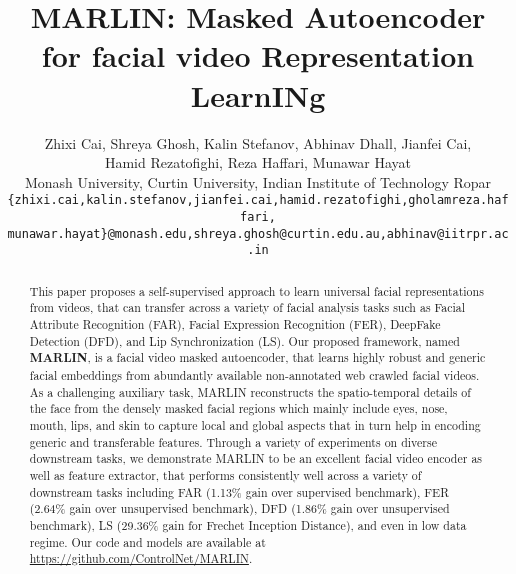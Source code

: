 \documentclass[10pt,twocolumn,letterpaper]{article}
\begin{document}
\title{MARLIN: \textbf{M}asked \textbf{A}utoencoder for facial video \textbf{R}epresentation \textbf{L}earn\textbf{IN}g}

\def\MH#1{{\bf [} {\it \color{red} {#1}}{\bf ]}.}

\author{Zhixi Cai, Shreya Ghosh, Kalin Stefanov, Abhinav Dhall, Jianfei Cai,\\ Hamid Rezatofighi, Reza Haffari, Munawar Hayat\\
Monash University,  Curtin University,  Indian Institute of Technology Ropar\\
\small \texttt{\{zhixi.cai,kalin.stefanov,jianfei.cai,hamid.rezatofighi,gholamreza.haffari,}\\ \small \texttt{munawar.hayat\}@monash.edu,shreya.ghosh@curtin.edu.au,abhinav@iitrpr.ac.in}}

\maketitle


\begin{abstract}
This paper proposes a self-supervised approach to learn universal facial representations from videos, that can transfer across a variety of facial analysis tasks such as Facial Attribute Recognition (FAR), Facial Expression Recognition (FER), DeepFake Detection (DFD), and Lip Synchronization (LS). Our proposed framework, named \textbf{MARLIN}, is a facial video masked autoencoder, that learns highly robust and generic facial embeddings from abundantly available non-annotated web crawled facial videos.
As a challenging auxiliary task, MARLIN reconstructs the spatio-temporal details of the face from the densely masked facial regions which mainly include eyes, nose, mouth, lips, and skin to capture local and global aspects that in turn help in encoding generic and transferable features. 
Through a variety of experiments on diverse downstream tasks, we demonstrate MARLIN to be an excellent facial video encoder as well as feature extractor, that performs consistently well across a variety of downstream tasks including FAR (1.13\% gain over supervised benchmark), FER (2.64\% gain over unsupervised benchmark), DFD (1.86\% gain over unsupervised benchmark), LS (29.36\% gain for Frechet Inception Distance), and even in low data regime.
Our code and models are available at \href{https://github.com/ControlNet/MARLIN}{https://github.com/ControlNet/MARLIN}.

\end{abstract}
\end{document}
